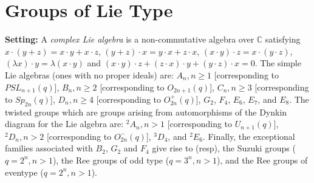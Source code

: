 \section{Groups of Lie Type}
{\bf Setting:}
A \emph{complex Lie algebra} is a non-commutative algebra over ${\mathbb C}$ satisfying
$x \cdot (y+z)= x \cdot y + x \cdot z$,
$(y+z) \cdot x =  y \cdot x + z \cdot x$, $(x \cdot y) \cdot z = x \cdot (y \cdot z)$,
$(\lambda x) \cdot y = \lambda (x \cdot y)$ and
$ (x \cdot y) \cdot z + (z \cdot x) \cdot y + (y \cdot z) \cdot x = 0$.
The simple Lie algebras (ones with no proper ideals) are:
$A_n, n \ge 1$ [corresponding to $PSL_{n+1}(q)$],
$B_n, n \ge 2$ [corresponding to $O_{2n+1}(q)$],
$C_n, n \ge 3$ [corresponding to $Sp_{2n}(q)$],
$D_n, n \ge 4$ [corresponding to $O^+_{2n}(q)$],
$G_2$,
$F_4$,
$E_6$,
$E_7$, and
$E_8$.  The twisted groups which are groups arising from automorphisms of the Dynkin
diagram for the Lie algebra are:
$^2A_n, n > 1$ [corresponding to $U_{n+1}(q)$],
$^2D_n, n > 2$ [corresponding to $O^-_{2n}(q)$],
$^3D_4$, and $^2E_6$.  Finally, the exceptional families associated with
$B_2$, $G_2$ and $F_4$ give rise to (resp), 
the Suzuki groups ($q=2^n, n > 1$),
the Ree groups of odd type ($q=3^n, n > 1$), and
the Ree groups of eventype ($q=2^n, n > 1$).

